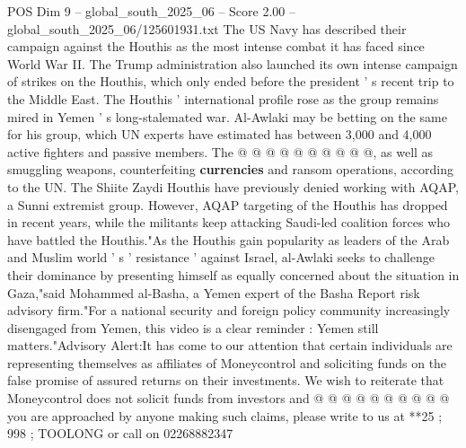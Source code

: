 \begin{textsample}{POS Dim 9 – global\_south\_2025\_06 – Score 2.00 – global\_south\_2025\_06/125601931.txt}
The US Navy has described their campaign against the Houthis as the most intense combat it has faced since World War II.
The Trump administration also launched its own intense campaign of strikes on the Houthis, which only ended before the president ' s recent trip to the Middle East.
The Houthis ' international profile rose as the group remains mired in Yemen ' s long-stalemated war.
Al-Awlaki may be betting on the same for his group, which UN experts have estimated has between 3,000 and 4,000 active fighters and passive members.
The @ @ @ @ @ @ @ @ @ @, as well as smuggling weapons, counterfeiting \textbf{currencies} and ransom operations, according to the UN.
The Shiite Zaydi Houthis have previously denied working with AQAP, a Sunni extremist group.
However, AQAP targeting of the Houthis has dropped in recent years, while the militants keep attacking Saudi-led coalition forces who have battled the Houthis."As the Houthis gain popularity as leaders of the Arab and Muslim world ' s ' resistance ' against Israel, al-Awlaki seeks to challenge their dominance by presenting himself as equally concerned about the situation in Gaza,"said Mohammed al-Basha, a Yemen expert of the Basha Report risk advisory firm."For a national security and foreign policy community increasingly disengaged from Yemen, this video is a clear reminder : Yemen still matters."Advisory Alert:It has come to our attention that certain individuals are representing themselves as affiliates of Moneycontrol and soliciting funds on the false promise of assured returns on their investments.
We wish to reiterate that Moneycontrol does not solicit funds from investors and @ @ @ @ @ @ @ @ @ @ you are approached by anyone making such claims, please write to us at **25 ; 998 ; TOOLONG or call on 02268882347

\end{textsample}
